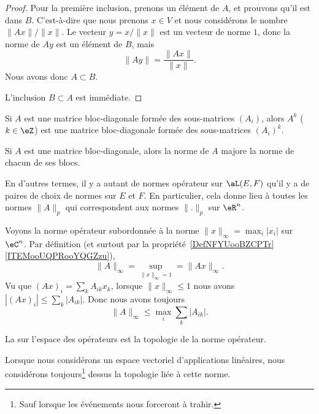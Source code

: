 \begin{proof}
	Pour la première inclusion, prenons un élément de \( A\), et prouvons qu'il est dans \( B\). C'est-à-dire que nous prenons \( x\in V\) et nous considérons le nombre \( \| Ax \|/\| x \|\). Le vecteur \( y=x/\| x \|\) est un vecteur de norme \( 1\), donc la norme de \( Ay\) est un élément de \( B\), mais
	\begin{equation}
		\| Ay \|=\frac{ \| Ax \| }{ \| x \| }.
	\end{equation}
	Nous avons donc \( A\subset B\).

	L'inclusion \( B\subset A\) est immédiate.
\end{proof}

\begin{lemma}       \label{LEMooHGCKooBzfAtg}
	Si \( A\) est une matrice bloc-diagonale formée des sous-matrices \( (A_i)\), alors \( A^k\) (\( k\in \eZ\)) est une matrice bloc-diagonale formée des sous-matrices \( (A_i)^k\).
\end{lemma}

\begin{proposition}      \label{PROPooJUYCooHnlFef}
	Si \( A\) est une matrice bloc-diagonale, alors la norme de \( A\) majore la norme de chacun de ses blocs.
\end{proposition}

En d'autres termes, il y a autant de normes opérateur sur \( \aL(E,F)\) qu'il y a de paires de choix de normes sur \( E\) et \( F\). En particulier, cela donne lieu à toutes les normes \( \| A \|_p\) qui correspondent aux normes \( \| . \|_p\) sur \( \eR^n\).

\begin{example}     \label{EXooXPXAooYyBwMX}
	Voyons la norme opérateur subordonnée à la norme \( \| x \|_{\infty}=\max_i| x_i |\) sur \( \eC^n\). Par définition (et surtout par la propriété~\ref{DefNFYUooBZCPTr}\ref{ITEMooUQPRooYQGZzu}),
	\begin{equation}
		\| A \|_{\infty}=\sup_{\| x \|_{\infty}=1}=\| Ax \|_{\infty}.
	\end{equation}
	Vu que \( (Ax)_i=\sum_kA_{ik}x_k\), lorsque \( \| x \|_{\infty}\leq 1\) nous avons \( | (Ax)_i |\leq \sum_k| A_{ik} |\). Donc nous avons toujours
	\begin{equation}        \label{EQooPLCIooVghasD}
		\| A \|_{\infty}\leq \max_i\sum_{k}| A_{ik} |.
	\end{equation}
\end{example}

\begin{definition}
	La  sur l'espace des opérateurs est la topologie de la norme opérateur.
\end{definition}
Lorsque nous considérons un espace vectoriel d'applications linéaires, nous considérons toujours\footnote{Sauf lorsque les événements nous forceront à trahir.} dessus la topologie liée à cette norme.

